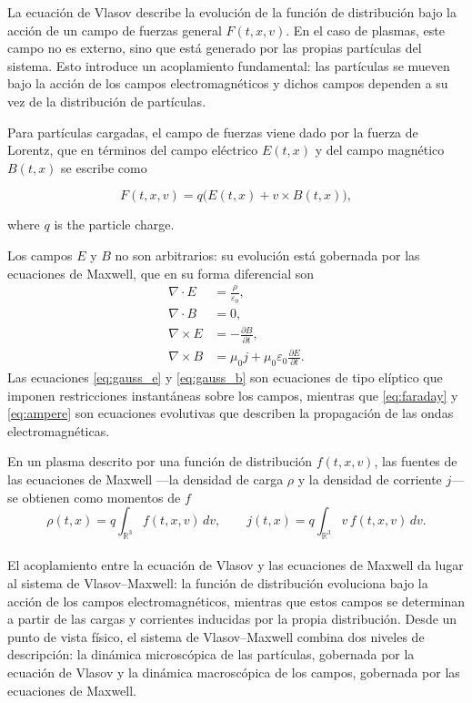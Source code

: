 \documentclass[11pt,a4paper,twoside,pdf]{article}
\numberwithin{equation}{section}
\begin{document}
La ecuación de Vlasov describe la evolución de la función de distribución bajo la
acción de un campo de fuerzas general $F(t,x,v)$. En el caso de plasmas, este campo
no es externo, sino que está generado por las propias partículas del
sistema. Esto introduce un acoplamiento fundamental: las partículas se mueven bajo
la acción de los campos electromagnéticos y dichos campos dependen a su vez de
la distribución de partículas.

Para partículas cargadas, el campo de fuerzas viene dado por la fuerza de Lorentz,
que en términos del campo eléctrico $E(t,x)$ y del campo magnético $B(t,x)$ se
escribe como \cite{martin2021campo}


\[
F(t,x,v) = q\big(E(t,x) + v \times B(t,x)\big),
\]


where $q$ is the particle charge. 



Los campos $E$ y $B$ no son arbitrarios: su evolución está gobernada por las
ecuaciones de Maxwell, que en su forma diferencial son
\begin{align}
\nabla \cdot E &= \frac{\rho}{\varepsilon_0}, \label{eq:gauss_e}\\
\nabla \cdot B &= 0, \label{eq:gauss_b}\\
\nabla \times E &= -\frac{\partial B}{\partial t}, \label{eq:faraday}\\
\nabla \times B &= \mu_0 j + \mu_0 \varepsilon_0 \frac{\partial E}{\partial t}. \label{eq:ampere}
\end{align}
Las ecuaciones \eqref{eq:gauss_e} y \eqref{eq:gauss_b} son ecuaciones de tipo
elíptico que imponen restricciones instantáneas sobre los campos, mientras que
\eqref{eq:faraday} y \eqref{eq:ampere} son ecuaciones evolutivas que describen la
propagación de las ondas electromagnéticas.


En un plasma descrito por una función de distribución $f(t,x,v)$, las fuentes de las
ecuaciones de Maxwell —la densidad de carga $\rho$ y la densidad de corriente $j$—
se obtienen como momentos de $f$
\begin{equation}
\rho(t,x) = q \int_{\mathbb{R}^3} f(t,x,v)\,dv, 
\qquad
j(t,x) = q \int_{\mathbb{R}^3} v\, f(t,x,v)\,dv.
\label{eq:rho_J}
\end{equation}
\\


\newpage
El acoplamiento entre la ecuación de Vlasov y las ecuaciones de Maxwell da lugar al
sistema de Vlasov–Maxwell: la función de distribución evoluciona bajo la acción de los campos
electromagnéticos, mientras que estos campos se determinan a partir de las cargas y
corrientes inducidas por la propia distribución. Desde un punto de vista físico, el sistema de Vlasov–Maxwell combina dos niveles de
descripción: la dinámica microscópica de las partículas, gobernada por la ecuación de Vlasov y la dinámica macroscópica de los campos, gobernada por las ecuaciones de Maxwell.\newline
\end{document}
